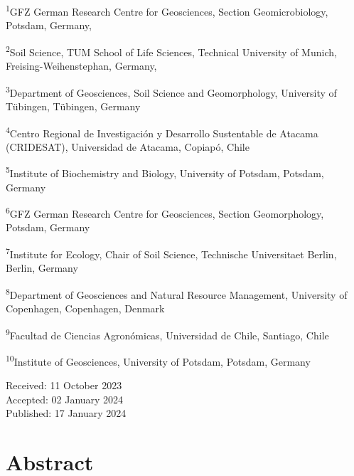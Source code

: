   \begin{small}
    \begin{justify}
    
        \textsuperscript{1}GFZ German Research Centre for Geosciences, Section Geomicrobiology, Potsdam, Germany,
        
        \textsuperscript{2}Soil Science, TUM School of Life Sciences, Technical University of Munich, Freising-Weihenstephan, Germany, 
        
        \textsuperscript{3}Department of Geosciences, Soil Science and Geomorphology, University of Tübingen, Tübingen, Germany
        
        \textsuperscript{4}Centro Regional de Investigación y Desarrollo Sustentable de Atacama (CRIDESAT), Universidad de Atacama, Copiapó, Chile
        
        \textsuperscript{5}Institute of Biochemistry and Biology, University of Potsdam, Potsdam, Germany

        \textsuperscript{6}GFZ German Research Centre for Geosciences, Section Geomorphology, Potsdam, Germany

        \textsuperscript{7}Institute for Ecology, Chair of Soil Science, Technische Universitaet Berlin, Berlin, Germany

        \textsuperscript{8}Department of Geosciences and Natural Resource Management, University of Copenhagen, Copenhagen, Denmark

        \textsuperscript{9}Facultad de Ciencias Agronómicas, Universidad de Chile, Santiago, Chile

        \textsuperscript{10}Institute of Geosciences, University of Potsdam, Potsdam, Germany

    \end{justify}
  \end{small}
    
  \vspace{0.5cm}
  \begin{center}
    Received: 11 October 2023\\
    Accepted: 02 January 2024\\
    Published: 17 January 2024
  \end{center}
  \cleardoublepage
  
\section*{Abstract} %

